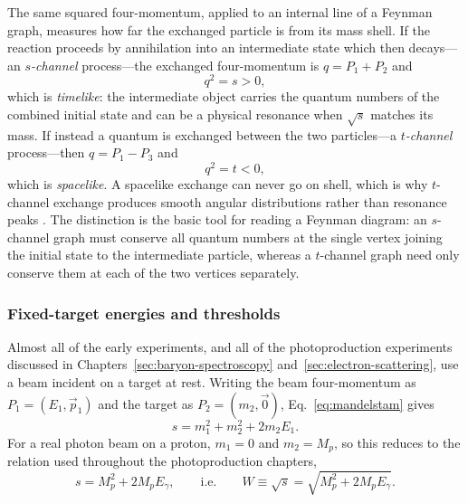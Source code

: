 The same squared four-momentum, applied to an internal line of a Feynman graph, measures
how far the exchanged particle is from its mass shell. If the reaction proceeds by
annihilation into an intermediate state which then decays---an \emph{$s$-channel}
process---the exchanged four-momentum is $q = P_1 + P_2$ and
\begin{equation}
    q^2 = s > 0 ,
    \label{eq:schannel}
\end{equation}
which is \emph{timelike}: the intermediate object carries the quantum numbers of the
combined initial state and can be a physical resonance when $\sqrt{s}$ matches its mass.
If instead a quantum is exchanged between the two particles---a \emph{$t$-channel}
process---then $q = P_1 - P_3$ and
\begin{equation}
    q^2 = t < 0 ,
    \label{eq:tchannel}
\end{equation}
which is \emph{spacelike}. A spacelike exchange can never go on shell, which is why
$t$-channel exchange produces smooth angular distributions rather than resonance peaks
\cite[Ch.~4]{HalzenMartin1984}.
The distinction is the basic tool for reading a Feynman diagram: an $s$-channel graph
must conserve all quantum numbers at the single vertex joining the initial state to the
intermediate particle, whereas a $t$-channel graph need only conserve them at each of
the two vertices separately.

\subsubsection{Fixed-target energies and thresholds}
\label{subsubsec:thresholds}

Almost all of the early experiments, and all of the photoproduction experiments discussed
in Chapters~\ref{sec:baryon-spectroscopy} and~\ref{sec:electron-scattering}, use a beam
incident on a target at rest. Writing the beam four-momentum as $P_1 = (E_1, \vec p_1)$
and the target as $P_2 = (m_2, \vec 0)$, Eq.~\eqref{eq:mandelstam} gives
\begin{equation}
    s = m_1^2 + m_2^2 + 2 m_2 E_1 .
    \label{eq:s_fixed_target}
\end{equation}
For a real photon beam on a proton, $m_1 = 0$ and $m_2 = M_p$, so this reduces to the
relation used throughout the photoproduction chapters,
\begin{equation}
    s = M_p^2 + 2 M_p E_\gamma ,
    \qquad\text{i.e.}\qquad
    W \equiv \sqrt{s} = \sqrt{M_p^2 + 2 M_p E_\gamma}.
    \label{eq:s_photon}
\end{equation}

